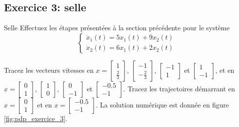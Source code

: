         \subsection{Exercice 3: selle}
            \begin{exercise}{Selle}
                Effectuez les étapes présentées à la section précédente pour le système
                \begin{equation}
                    \begin{cases}
                        \dot{x}_1(t) = 5 x_1(t) + 9 x_2(t)\\
                        \dot{x}_2(t) = 6 x_1(t) + 2 x_2(t)
                    \end{cases}
                \end{equation}
            \end{exercise}
            Tracez les vecteurs vitesses en $x = \begin{bmatrix}1 \\ \frac23\end{bmatrix}$, $\begin{bmatrix}-1 \\ -\frac23\end{bmatrix}$, $\begin{bmatrix}-1 \\ 1\end{bmatrix}$ et $\begin{bmatrix}1 \\ -1\end{bmatrix}$, et en $x = \begin{bmatrix}0 \\ 1\end{bmatrix}$, $\begin{bmatrix}1 \\ 0\end{bmatrix}$, $\begin{bmatrix}0 \\ -1\end{bmatrix}$ et $\begin{bmatrix}-0.5 \\ -1\end{bmatrix}$. Tracez les trajectoires démarrant en $x = \begin{bmatrix}0 \\ 1\end{bmatrix}$ et en $x = \begin{bmatrix}-0.5 \\ -1\end{bmatrix}$.
            La solution numérique est donnée en figure \ref{fig:pdp_exercice_3}.
